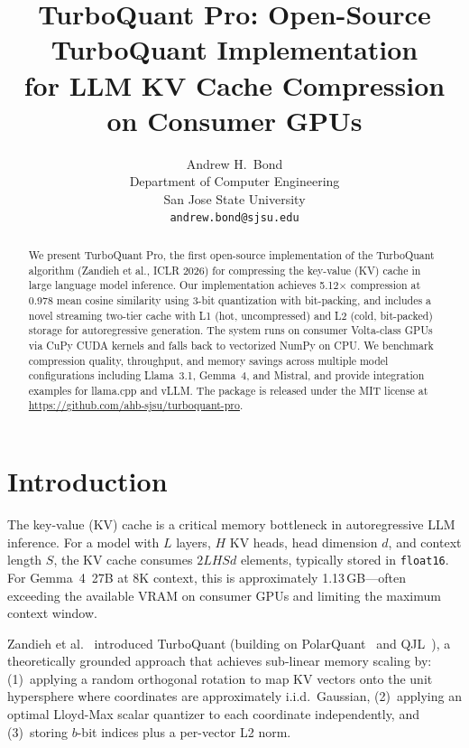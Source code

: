 \documentclass{article}
\title{TurboQuant Pro: Open-Source TurboQuant Implementation \\
for LLM KV Cache Compression on Consumer GPUs}
\author{
  Andrew H.\ Bond \\
  Department of Computer Engineering \\
  San Jose State University \\
  \texttt{andrew.bond@sjsu.edu}
}
\begin{document}
\maketitle

\begin{abstract}
We present TurboQuant Pro, the first open-source implementation of the
TurboQuant algorithm (Zandieh et al., ICLR 2026) for compressing
the key-value (KV) cache in large language model inference.  Our
implementation achieves 5.12$\times$ compression at 0.978 mean cosine
similarity using 3-bit quantization with bit-packing, and includes a
novel streaming two-tier cache with L1 (hot, uncompressed) and L2
(cold, bit-packed) storage for autoregressive generation.  The system
runs on consumer Volta-class GPUs via CuPy CUDA kernels and falls back
to vectorized NumPy on CPU.  We benchmark compression quality,
throughput, and memory savings across multiple model configurations
including Llama~3.1, Gemma~4, and Mistral, and provide integration
examples for llama.cpp and vLLM.  The package is released under the
MIT license at \url{https://github.com/ahb-sjsu/turboquant-pro}.
\end{abstract}

\section{Introduction}
\label{sec:intro}

The key-value (KV) cache is a critical memory bottleneck in autoregressive
LLM inference.  For a model with $L$ layers, $H$ KV heads, head dimension
$d$, and context length $S$, the KV cache consumes $2LHSd$ elements,
typically stored in \texttt{float16}.  For Gemma~4~27B at 8K context, this
is approximately 1.13\,GB---often exceeding the available VRAM on consumer
GPUs and limiting the maximum context window.

Zandieh et al.~\cite{turboquant} introduced TurboQuant (building on PolarQuant~\cite{polarquant} and QJL~\cite{qjl}), a
theoretically grounded approach that achieves sub-linear memory scaling by:
(1)~applying a random orthogonal rotation to map KV vectors onto the unit
hypersphere where coordinates are approximately i.i.d.\ Gaussian,
(2)~applying an optimal Lloyd-Max scalar quantizer to each coordinate
independently, and (3)~storing $b$-bit indices plus a per-vector L2 norm.
\end{document}
